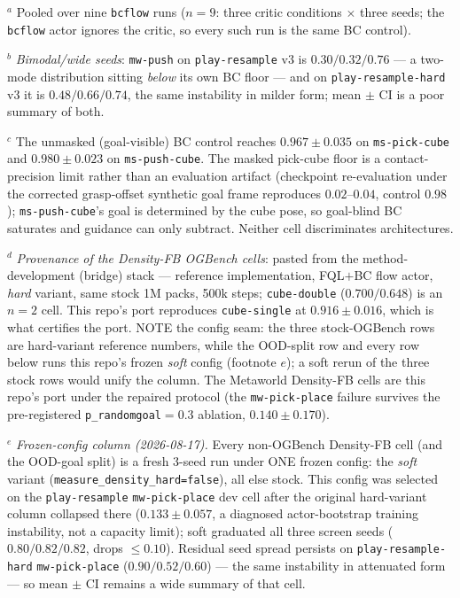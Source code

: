\documentclass[10pt]{article}
\begin{document}
$^{a}$ Pooled over nine \texttt{bcflow} runs ($n{=}9$: three critic conditions $\times$
three seeds; the \texttt{bcflow} actor ignores the critic, so every such run is the same
BC control).

$^{b}$ \emph{Bimodal/wide seeds}: \texttt{mw-push} on \texttt{play-resample} v3 is
$0.30/0.32/0.76$ --- a two-mode distribution sitting \emph{below} its own BC floor ---
and on \texttt{play-resample-hard} v3 it is $0.48/0.66/0.74$, the same instability in
milder form; mean $\pm$ CI is a poor summary of both.

$^{c}$ The unmasked (goal-visible) BC control reaches $0.967\pm0.035$ on
\texttt{ms-pick-cube} and $0.980\pm0.023$ on \texttt{ms-push-cube}. The masked pick-cube
floor is a contact-precision limit rather than an evaluation artifact (checkpoint
re-evaluation under the corrected grasp-offset synthetic goal frame reproduces
$0.02$--$0.04$, control $0.98$); \texttt{ms-push-cube}'s goal is determined by the cube
pose, so goal-blind BC saturates and guidance can only subtract. Neither cell
discriminates architectures.

$^{d}$ \emph{Provenance of the Density-FB OGBench cells}: pasted from the
method-development (bridge) stack --- reference implementation, FQL$+$BC flow actor,
\emph{hard} variant, same stock 1M packs, 500k steps; \texttt{cube-double} ($0.700/0.648$)
is an $n{=}2$ cell. This repo's port reproduces
\texttt{cube-single} at $0.916\pm0.016$, which is what certifies the port. NOTE the config
seam: the three stock-OGBench rows are hard-variant reference numbers, while the OOD-split
row and every row below runs this repo's frozen \emph{soft} config (footnote $e$); a soft
rerun of the three stock rows would unify the column. The Metaworld Density-FB cells are this
repo's port under the repaired protocol (the \texttt{mw-pick-place} failure survives the
pre-registered \texttt{p\_randomgoal}$=0.3$ ablation, $0.140\pm0.170$).

$^{e}$ \emph{Frozen-config column (2026-08-17).} Every non-OGBench Density-FB cell (and the
OOD-goal split) is a fresh 3-seed run under ONE frozen config: the \emph{soft} variant
(\texttt{measure\_density\_hard=false}), all else stock. This config was selected on the
\texttt{play-resample} \texttt{mw-pick-place} dev cell after the original hard-variant
column collapsed there ($0.133\pm0.057$, a diagnosed actor-bootstrap training instability,
not a capacity limit); soft graduated all three screen seeds ($0.80/0.82/0.82$, drops
$\le0.10$). Residual seed spread persists on \texttt{play-resample-hard}
\texttt{mw-pick-place} ($0.90/0.52/0.60$) --- the same instability in attenuated form ---
so mean $\pm$ CI remains a wide summary of that cell.
\end{document}

